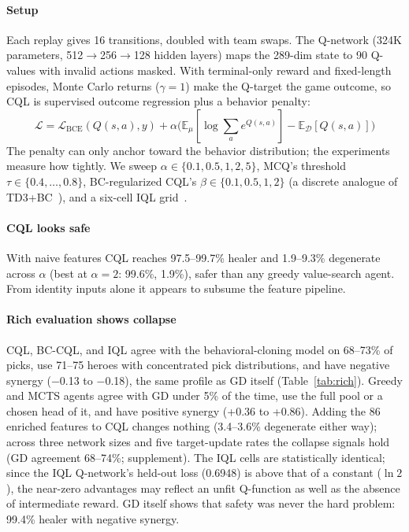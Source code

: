\documentclass[journal]{IEEEtran}
\begin{document}
\paragraph{Setup} Each replay gives 16 transitions, doubled with team swaps. The Q-network (324K parameters, 512$\to$256$\to$128 hidden layers) maps the 289-dim state to 90 Q-values with invalid actions masked. With terminal-only reward and fixed-length episodes, Monte Carlo returns ($\gamma = 1$) make the Q-target the game outcome, so CQL is supervised outcome regression plus a behavior penalty:
\begin{equation}
\mathcal{L} = \mathcal{L}_\text{BCE}(Q(s,a), y) + \alpha \big( \mathbb{E}_\mu[\log \textstyle\sum_a e^{Q(s,a)}] - \mathbb{E}_\mathcal{D}[Q(s,a)] \big)
\end{equation}
The penalty can only anchor toward the behavior distribution; the experiments measure how tightly. We sweep $\alpha \in \{0.1, 0.5, 1, 2, 5\}$, MCQ's threshold $\tau \in \{0.4,\dots,0.8\}$, BC-regularized CQL's $\beta \in \{0.1, 0.5, 1, 2\}$ (a discrete analogue of TD3+BC~\cite{fujimoto2021minimalist}), and a six-cell IQL grid~\cite{kostrikov2022iql}.

\paragraph{CQL looks safe} With naive features CQL reaches 97.5--99.7\% healer and 1.9--9.3\% degenerate across $\alpha$ (best at $\alpha = 2$: 99.6\%, 1.9\%), safer than any greedy value-search agent. From identity inputs alone it appears to subsume the feature pipeline.

\paragraph{Rich evaluation shows collapse} CQL, BC-CQL, and IQL agree with the behavioral-cloning model on 68--73\% of picks, use 71--75 heroes with concentrated pick distributions, and have negative synergy ($-$0.13 to $-$0.18), the same profile as GD itself (Table~\ref{tab:rich}). Greedy and MCTS agents agree with GD under 5\% of the time, use the full pool or a chosen head of it, and have positive synergy (+0.36 to +0.86). Adding the 86 enriched features to CQL changes nothing (3.4--3.6\% degenerate either way); across three network sizes and five target-update rates the collapse signals hold (GD agreement 68--74\%; supplement). The IQL cells are statistically identical; since the IQL Q-network's held-out loss (0.6948) is above that of a constant ($\ln 2$), the near-zero advantages may reflect an unfit Q-function as well as the absence of intermediate reward. GD itself shows that safety was never the hard problem: 99.4\% healer with negative synergy.
\end{document}
